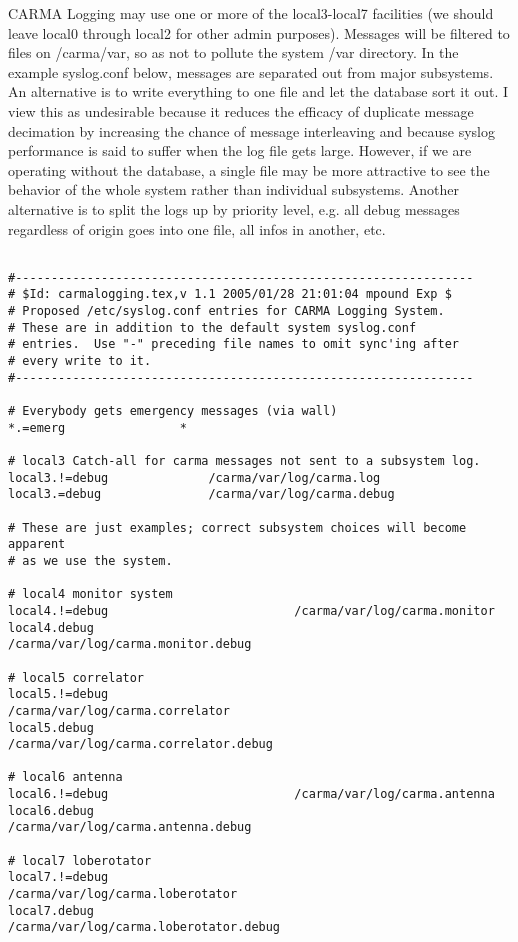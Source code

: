 \documentclass[preprint]{aastex}
\begin{document}
CARMA Logging may use one or more of the local3-local7 facilities 
(we should leave local0 through local2 for other admin purposes).
Messages will be filtered to files on /carma/var, so as not
to pollute the system /var directory.
In the example syslog.conf below, messages are separated out from
major subsystems. An alternative is to write everything to one file
and let the database sort it out. I view this as undesirable because
it reduces the efficacy of duplicate message decimation by increasing the
chance of message interleaving and because syslog performance is said
to suffer when the log file gets large.  However, if we are operating
without the database, a single file may be more attractive to
see the behavior of the whole system rather than individual
subsystems.  Another alternative is to
split the logs up by priority level, e.g. all debug messages regardless
of origin goes into one file, all infos in another, etc.

\begin{verbatim}

#----------------------------------------------------------------
# $Id: carmalogging.tex,v 1.1 2005/01/28 21:01:04 mpound Exp $ 
# Proposed /etc/syslog.conf entries for CARMA Logging System.
# These are in addition to the default system syslog.conf
# entries.  Use "-" preceding file names to omit sync'ing after
# every write to it.
#----------------------------------------------------------------

# Everybody gets emergency messages (via wall)
*.=emerg				*

# local3 Catch-all for carma messages not sent to a subsystem log.
local3.!=debug 				/carma/var/log/carma.log
local3.=debug				/carma/var/log/carma.debug

# These are just examples; correct subsystem choices will become apparent
# as we use the system.

# local4 monitor system
local4.!=debug                          /carma/var/log/carma.monitor
local4.debug                            /carma/var/log/carma.monitor.debug

# local5 correlator 
local5.!=debug                          /carma/var/log/carma.correlator
local5.debug                            /carma/var/log/carma.correlator.debug

# local6 antenna
local6.!=debug                          /carma/var/log/carma.antenna
local6.debug                            /carma/var/log/carma.antenna.debug

# local7 loberotator
local7.!=debug                          /carma/var/log/carma.loberotator
local7.debug                            /carma/var/log/carma.loberotator.debug

\end{verbatim}
\end{document}
